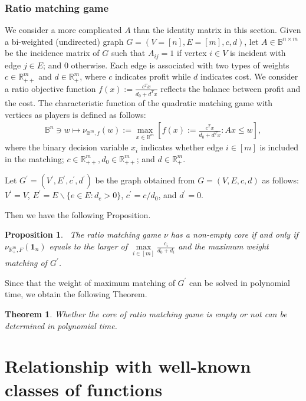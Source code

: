 \documentclass[11pt]{article}\usepackage[]{graphicx}\usepackage[]{xcolor}
\newtheorem{thm}{Theorem}
\newtheorem{prop}{Proposition}
\begin{document}
\subsubsection{Ratio matching game}
We consider a more complicated $A$ than the identity matrix in this section. Given a bi-weighted (undirected) graph $G=(V=[n], E=[m], c, d)$, let $A \in \mathbb{B}^{n\times m}$ be the incidence matrix of $G$ such that $A_{ij}=1$ if vertex $i\in V$ is incident with edge $j\in E$; and 0 otherwise. Each edge is associated with two types of weights $c\in \mathbb{R}^{m}_{++}$ and $d\in \mathbb{R}^{m}_{+}$, where $c$ indicates profit while $d$ indicates cost. We consider a ratio objective function $f(x):=\frac{c^Tx}{d_0+d^Tx}$ reflects the balance between profit and the cost. The characteristic function of the quadratic matching game with vertices as players is defined as follows:
\begin{eqnarray*}
\mathbb{B}^n\ni w\mapsto \nu_{\mathbb{B}^m,f}(w):=\max_{x \in \mathbb{B}^m} \left[f(x):=\frac{c^Tx}{d_0+d^Tx}: Ax\le w\right],
\end{eqnarray*}
where the binary decision variable $x_i$ indicates whether edge $i\in [m]$ is included in the matching; $c\in\mathbb{R}^m_{++}, d_0\in\mathbb{R}^m_{++}$; and $d\in\mathbb{R}^{m}_{+}$.



Let $G^{\prime}=(V^{\prime}, E^{\prime}, c^{\prime},d^{\prime})$ be the graph obtained from $G=(V, E, c,d)$ as follows: $V^{\prime}=V$, $E^{\prime}=E\backslash \{e\in E: d_e>0\}$, $c^{\prime}=c/d_0$, and $d^{\prime}=0$.

Then we have the following Proposition.
\begin{prop}~\label{prop:r-matching-core}
The ratio matching game $\nu$ has a non-empty core if and only if $\nu_{\mathbb{R}^m_{+},F}\left(\mathbf{1}_n\right)$ equals to the larger of $\max\limits_{i\in [m]}\frac{c_i}{d_0+d_i}$ and the maximum weight matching of $G^{\prime}$.
\end{prop}

Since that the weight of maximum matching of $G^{\prime}$ can be solved in polynomial time, we obtain the following Theorem.
\begin{thm}
Whether the core of ratio matching game is empty or not can be determined in polynomial time.
\end{thm}





\section{Relationship with well-known classes of functions}\label{sec:relationships}
\end{document}
